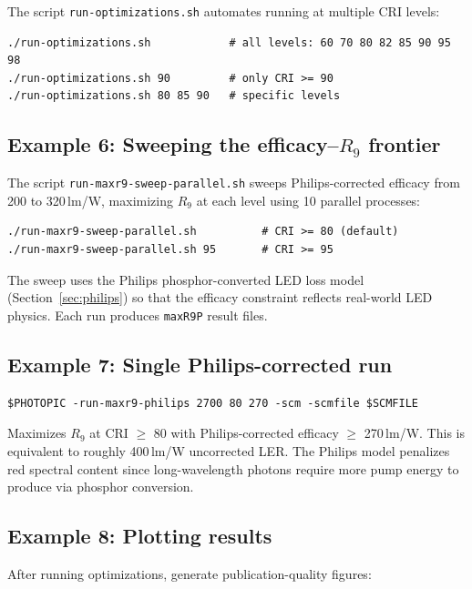 \documentclass[11pt]{article}
\newcommand{\file}[1]{\texttt{#1}}
\begin{document}
The script \file{run-optimizations.sh} automates running at multiple CRI
levels:

\begin{lstlisting}[style=shell]
./run-optimizations.sh            # all levels: 60 70 80 82 85 90 95 98
./run-optimizations.sh 90         # only CRI >= 90
./run-optimizations.sh 80 85 90   # specific levels
\end{lstlisting}

\subsection{Example 6: Sweeping the efficacy--\texorpdfstring{$R_9$}{R9} frontier}

The script \file{run-maxr9-sweep-parallel.sh} sweeps Philips-corrected
efficacy from 200 to 320\,lm/W, maximizing $R_9$ at each level using
10 parallel processes:

\begin{lstlisting}[style=shell]
./run-maxr9-sweep-parallel.sh          # CRI >= 80 (default)
./run-maxr9-sweep-parallel.sh 95       # CRI >= 95
\end{lstlisting}

The sweep uses the Philips phosphor-converted LED loss model
(Section~\ref{sec:philips}) so that the efficacy constraint reflects
real-world LED physics.  Each run produces \file{maxR9P} result files.

\subsection{Example 7: Single Philips-corrected run}

\begin{lstlisting}[style=shell]
$PHOTOPIC -run-maxr9-philips 2700 80 270 -scm -scmfile $SCMFILE
\end{lstlisting}

Maximizes $R_9$ at CRI $\geq$ 80 with Philips-corrected efficacy
$\geq$ 270\,lm/W.  This is equivalent to roughly 400\,lm/W uncorrected
LER.  The Philips model penalizes red spectral content since long-wavelength
photons require more pump energy to produce via phosphor conversion.

\subsection{Example 8: Plotting results}

After running optimizations, generate publication-quality figures:
\end{document}
